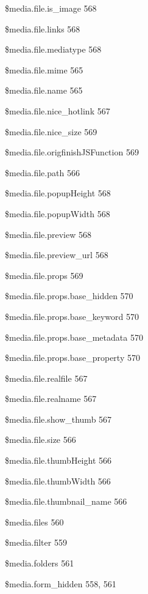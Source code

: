 \documentclass{book}
\renewcommand\subitem{\par}
\begin{document}
\begin{multicols}{2}
\begin{osp-index}
    \subitem \$media.file.is\_image\hspace{1mm} 568
    \subitem \$media.file.links\hspace{1mm} 568
    \subitem \$media.file.mediatype\hspace{1mm} 568
    \subitem \$media.file.mime\hspace{1mm} 565
    \subitem \$media.file.name\hspace{1mm} 565
    \subitem \$media.file.nice\_hotlink\hspace{1mm} 567
    \subitem \$media.file.nice\_size\hspace{1mm} 569
    \subitem \$media.file.origfinishJSFunction\hspace{1mm} 569
    \subitem \$media.file.path\hspace{1mm} 566
    \subitem \$media.file.popupHeight\hspace{1mm} 568
    \subitem \$media.file.popupWidth\hspace{1mm} 568
    \subitem \$media.file.preview\hspace{1mm} 568
    \subitem \$media.file.preview\_url\hspace{1mm} 568
    \subitem \$media.file.props\hspace{1mm} 569
    \subitem \$media.file.props.base\_hidden\hspace{1mm} 570
    \subitem \$media.file.props.base\_keyword\hspace{1mm} 570
    \subitem \$media.file.props.base\_metadata\hspace{1mm} 570
    \subitem \$media.file.props.base\_property\hspace{1mm} 570
    \subitem \$media.file.realfile\hspace{1mm} 567
    \subitem \$media.file.realname\hspace{1mm} 567
    \subitem \$media.file.show\_thumb\hspace{1mm} 567
    \subitem \$media.file.size\hspace{1mm} 566
    \subitem \$media.file.thumbHeight\hspace{1mm} 566
    \subitem \$media.file.thumbWidth\hspace{1mm} 566
    \subitem \$media.file.thumbnail\_name\hspace{1mm} 566
    \subitem \$media.files\hspace{1mm} 560
    \subitem \$media.filter\hspace{1mm} 559
    \subitem \$media.folders\hspace{1mm} 561
    \subitem \$media.form\_hidden\hspace{1mm} 558, 561

\end{osp-index}
\end{multicols}
\end{document}

